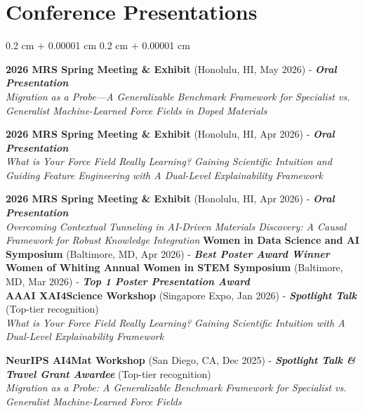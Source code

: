 \documentclass[10pt, letterpaper]{article}
\newenvironment{onecolentry}{
    \begin{adjustwidth}{
        0.2 cm + 0.00001 cm
    }{
        0.2 cm + 0.00001 cm
    }
}{
    \end{adjustwidth}
} %
\begin{document}
\section{Conference Presentations}
\begin{onecolentry}
\textbf{2026 MRS Spring Meeting \& Exhibit} (Honolulu, HI, May 2026) - \textbf{\textit{Oral Presentation}}\\
\textit{Migration as a Probe—A Generalizable Benchmark Framework for Specialist vs. Generalist Machine-Learned Force Fields in Doped Materials}
\vspace{0.1 cm}

\textbf{2026 MRS Spring Meeting \& Exhibit} (Honolulu, HI, Apr 2026) - \textbf{\textit{Oral Presentation}}\\
\textit{What is Your Force Field Really Learning? Gaining Scientific Intuition and Guiding Feature Engineering with A Dual-Level Explainability Framework}
\vspace{0.1 cm}

\textbf{2026 MRS Spring Meeting \& Exhibit} (Honolulu, HI, Apr 2026) - \textbf{\textit{Oral Presentation}}\\
\textit{Overcoming Contextual Tunneling in AI-Driven Materials Discovery: A Causal Framework for Robust Knowledge Integration}
\vspace{0.1 cm}
\textbf{Women in Data Science and AI Symposium} (Baltimore, MD, Apr 2026) - \textbf{\textit{Best Poster Award Winner}} \\
\vspace{0.1 cm}
\textbf{Women of Whiting Annual Women in STEM Symposium} (Baltimore, MD, Mar 2026) - \textbf{\textit{Top 1 Poster Presentation Award}} \\
\vspace{0.1 cm}
\textbf{AAAI XAI4Science Workshop} (Singapore Expo, Jan 2026) - 
\textbf{\textit{Spotlight Talk}} (Top-tier recognition)\\
\textit{What is Your Force Field Really Learning? Gaining Scientific Intuition with A Dual-Level Explainability Framework}
\vspace{0.1 cm}

\textbf{NeurIPS AI4Mat Workshop} (San Diego, CA, Dec 2025) - \textbf{\textit{Spotlight Talk \& Travel Grant Awardee}} (Top-tier recognition) \\
\textit{Migration as a Probe: A Generalizable Benchmark Framework for Specialist vs. Generalist Machine-Learned Force Fields}
\vspace{0.1 cm}


\end{onecolentry}
\end{document}
